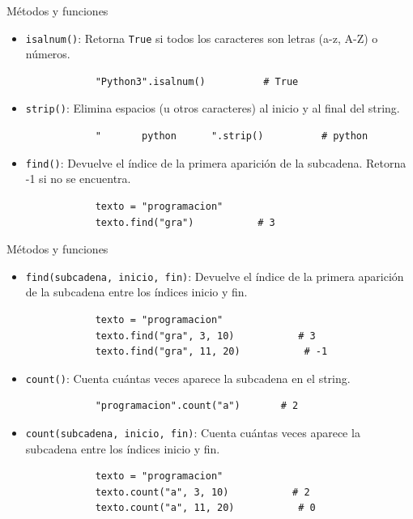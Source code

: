 \documentclass{beamer}
\begin{document}
    \begin{frame}[fragile,t]{Métodos y funciones}
        \begin{itemize}
            \item \texttt{isalnum()}: Retorna \texttt{True} si todos los caracteres son letras (a-z, A-Z) o números.
            \begin{verbatim}
            "Python3".isalnum()          # True
            \end{verbatim}
            \item \texttt{strip()}: Elimina espacios (u otros caracteres) al inicio y al final del string.
            \begin{verbatim}
            "       python      ".strip()          # python
            \end{verbatim}
            \item \texttt{find()}: Devuelve el índice de la primera aparición de la subcadena. Retorna -1 si no se encuentra.
                \begin{verbatim}
            texto = "programacion"
            texto.find("gra")           # 3
            \end{verbatim}
        \end{itemize}
    \end{frame}

    \begin{frame}[fragile,t]{Métodos y funciones}
        \begin{itemize}
            \item \texttt{find(subcadena, inicio, fin)}: Devuelve el índice de la primera aparición de la subcadena entre 
            los índices inicio y fin.
            \begin{verbatim}
            texto = "programacion"
            texto.find("gra", 3, 10)           # 3
            texto.find("gra", 11, 20)           # -1
            \end{verbatim}
            \item \texttt{count()}: Cuenta cuántas veces aparece la subcadena en el string.
            \begin{verbatim}
            "programacion".count("a")       # 2
            \end{verbatim}
            \item \texttt{count(subcadena, inicio, fin)}: Cuenta cuántas veces aparece la subcadena entre los índices 
            inicio y fin.
            \begin{verbatim}
            texto = "programacion"
            texto.count("a", 3, 10)           # 2
            texto.count("a", 11, 20)           # 0
            \end{verbatim}
        \end{itemize}
    \end{frame}
\end{document}
